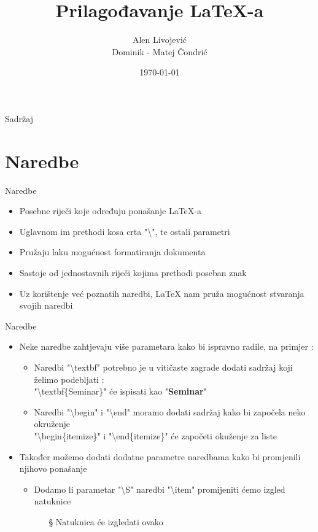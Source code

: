 \documentclass{beamer}
\title{Prilagođavanje LaTeX-a}
\author{Alen Livojević \\ Dominik - Matej Čondrić}
\institute{Tehnički fakultet Rijeka}
\date{\today}
\begin{document}
\begin{frame}
\titlepage
\end{frame}

\begin{frame}[t]{Sadržaj}
\tableofcontents
\end{frame}

\section{Naredbe}

\begin{frame}[t]{Naredbe}
\begin{itemize}
\item Posebne riječi koje određuju ponašanje LaTeX-a
\item Uglavnom im prethodi kosa crta "\textbackslash", te ostali parametri
\item Pružaju laku mogućnost formatiranja dokumenta 
\item Sastoje od jednostavnih riječi kojima prethodi poseban znak 
\item Uz korištenje već poznatih naredbi, LaTeX nam pruža mogućnost stvaranja svojih naredbi 
\end{itemize}
\end{frame}

\begin{frame}[t]{Naredbe}
\begin{itemize}
	\item Neke naredbe zahtjevaju više parametara kako bi ispravno radile, na primjer :
		\begin{itemize}
			\item Naredbi "\textbackslash textbf" potrebno je u vitičaste zagrade dodati sadržaj koji želimo podebljati :
			\\
			"\textbackslash textbf\{Seminar\}" će ispisati kao "\textbf{Seminar}" \\
			\item Naredbi "\textbackslash begin" i "\textbackslash end" moramo dodati sadržaj kako bi započela neko okruženje
			\\
			"\textbackslash begin\{itemize\}" i "\textbackslash end\{itemize\}" će započeti okuženje za liste 
		\end{itemize}
	\item Također možemo dodati dodatne parametre naredbama kako bi promjenili njihovo ponašanje
		\begin{itemize}
			\item Dodamo li parametar "\textbackslash S" naredbi "\textbackslash item" promijeniti ćemo izgled natuknice
			\begin{itemize}
				\item[\S] Natuknica će izgledati ovako
			\end{itemize}	
		\end{itemize}		
\end{itemize}	
\end{frame}
\end{document}
